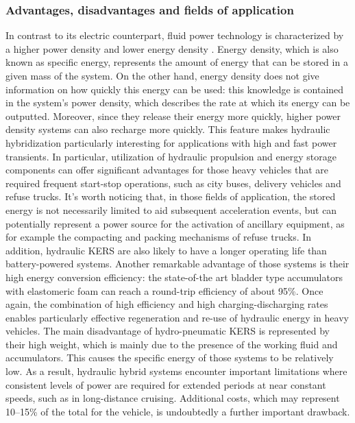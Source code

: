 \documentclass[11pt]{article}
\begin{document}
\subsubsection{Advantages, disadvantages and fields of application}

In contrast to its electric counterpart, fluid power technology is characterized by a higher power density and lower energy density \cite{f}. Energy density, which is also known as specific energy, represents the amount of energy that can be stored in a given mass of the system. On the other hand, energy density does not give information on how quickly this energy can be used: this knowledge is contained in the system's power density, which describes the rate at which its energy can be outputted. Moreover, since they release their energy more quickly, higher power density systems can also recharge more quickly. This feature makes hydraulic hybridization particularly interesting for applications with high and fast power transients.  In particular, utilization of hydraulic propulsion and energy storage components can offer significant advantages for those heavy vehicles that are required frequent start-stop operations, such as city buses, delivery vehicles and refuse trucks. It’s worth noticing that, in those fields of application, the stored energy is not necessarily limited to aid subsequent acceleration events, but can potentially represent a power source for the activation of ancillary equipment, as for example the compacting and packing mechanisms of refuse trucks. In addition, hydraulic KERS are also likely to have a longer operating life than battery-powered systems.  Another remarkable advantage of those systems is their high energy conversion efficiency: the state-of-the art bladder type accumulators with elastomeric foam can reach a round-trip efficiency of about 95\%. Once again, the combination of high efficiency and high charging-discharging rates enables particularly effective regeneration and re-use of hydraulic energy in heavy vehicles.
The main disadvantage of hydro-pneumatic KERS is represented by their high weight, which is mainly due to the presence of the working fluid and accumulators. This causes the specific energy of those systems to be relatively low. As a result, hydraulic hybrid systems encounter important limitations where consistent levels of power are required for extended periods at near constant speeds, such as in long-distance cruising.
Additional costs, which may represent 10–15\% of the total for the vehicle, is undoubtedly a further important drawback.
\end{document}
